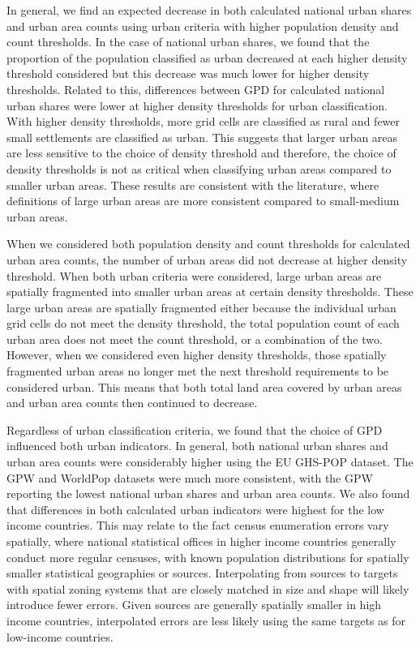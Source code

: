 \documentclass[review]{elsarticle}
\begin{document}
	
	In general, we find an expected decrease in both calculated national urban shares and urban area counts using urban criteria with higher population density and count thresholds.
	In the case of national urban shares, we found that the proportion of the population classified as urban decreased at each higher density threshold considered but this decrease was much lower for higher density thresholds.
	Related to this, differences between GPD for calculated national urban shares were lower at higher density thresholds for urban classification.
	With higher density thresholds, more grid cells are classified as rural and fewer small settlements are classified as urban.
	This suggests that larger urban areas are less sensitive to the choice of density threshold and therefore, the choice of density thresholds is not as critical when classifying urban areas compared to smaller urban areas.
	These results are consistent with the literature, where definitions of large urban areas are more consistent compared to small-medium urban areas.

	
	When we considered both population density and count thresholds for calculated urban area counts, the number of urban areas did not decrease at higher density threshold.
	When both urban criteria were considered, large urban areas are spatially fragmented into smaller urban areas at certain density thresholds.
	These large urban areas are spatially fragmented either because the individual urban grid cells do not meet the density threshold, the total population count of each urban area does not meet the count threshold, or a combination of the two.
	However, when we considered even higher density thresholds, those spatially fragmented urban areas no longer met the next threshold requirements to be considered urban.
	This means that both total land area covered by urban areas and urban area counts then continued to decrease.
	
	
	Regardless of urban classification criteria, we found that the choice of GPD influenced both urban indicators.
	In general, both national urban shares and urban area counts were considerably higher using the EU GHS-POP dataset.
	The GPW and WorldPop datasets were much more consistent, with the GPW reporting the lowest national urban shares and urban area counts. 
	We also found that differences in both calculated urban indicators were highest for the low income countries.
	This may relate to the fact census enumeration errors vary spatially, where national statistical offices in higher income countries generally conduct more regular censuses, with known population distributions for spatially smaller statistical geographies or sources.
	Interpolating from sources to targets with spatial zoning systems that are closely matched in size and shape will likely introduce fewer errors.
	Given sources are generally spatially smaller in high income countries, interpolated errors are less likely using the same targets as for low-income countries.
	
\end{document}
